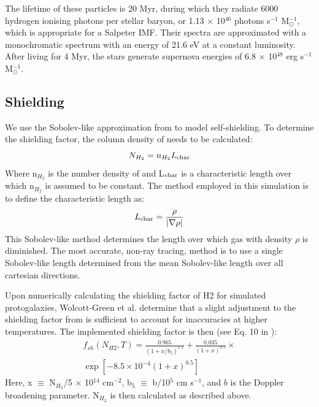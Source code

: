 \documentclass[a4paper,fleqn,usenatbib]{mnras}
\begin{document}
The lifetime of these particles is 20 Myr, during which they radiate 6000 hydrogen ionising photons per stellar baryon, or 1.13 $\times$ 10$^{46}$ photons s$^{-1}$ M$_{\odot}^{-1}$, which is appropriate for a Salpeter IMF. Their spectra are approximated with a monochromatic spectrum with an energy of 21.6 eV at a constant luminosity. After living for 4 Myr, the stars generate supernova energies of 6.8 $\times$ 10$^{48}$ erg s$^{-1}$ M$_{\odot}^{-1}$.

\subsection{\hh{} Shielding}
We use the Sobolev-like approximation from \citet{Wolcott11} to model \hh{} self-shielding. To determine the \hh{} shielding factor, the column density of \hh{} needs to be calculated:
\begin{equation} \label{Nh2}
	N_{H_{2}} = n_{H_{2}}L_{\rm char}
\end{equation}
Where n$_{H_{2}}$ is the number density of \hh{} and L$_{\rm char}$ is a characteristic length over which n$_{H_{2}}$ is assumed to be constant. The method employed in this simulation is to define the characteristic length as:
\begin{equation} \label{Lchar}
	L_{\rm char} = \frac{\rho}{|\nabla \rho|}
\end{equation}
This Sobolev-like method determines the length over which gas with density $\rho$ is diminished. The most accurate, non-ray tracing, method is to use a single Sobolev-like length determined from the mean Sobolev-like length over all cartesian directions. 

Upon numerically calculating the shielding factor of H2 for simulated protogalaxies, Wolcott-Green et al. determine that a slight adjustment to the shielding factor from \citet{Draine96} is sufficient to account for inaccuracies at higher temperatures. The implemented shielding factor is then (see Eq. 10 in \citet{Wolcott11}):
\begin{equation} \label{shield}
	\begin{multlined}
	f_{sh}(N_{H2}, T) = \frac{0.965}{(1+x/b_{5})^{1.1}} + \frac{0.035}{(1+x)^{0.5}}  \times \\ \exp [-8.5 \times 10^{-4} (1+x)^{0.5}]
	\end{multlined}
\end{equation}
Here, x $\equiv$ N$_{H_{2}}$/5 $\times$ 10$^{14}$ cm$^{-2}$, b$_{5}$ $\equiv$ b/10$^{5}$ cm s$^{-1}$, and $b$ is the Doppler broadening parameter. N$_{H_{2}}$ is then calculated as described above.
\end{document}
